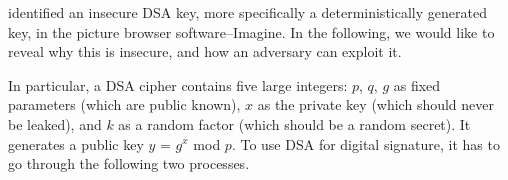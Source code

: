 


\sysname identified an insecure \textsf{\small DSA} key, more specifically a deterministically generated key, in the picture browser software--\textsf{\small Imagine}. In the following, we would like to reveal why this is insecure, and how an adversary can exploit it.

In particular, a \textsf{\small DSA} cipher contains five large integers:  $p$, $q$, $g$ as fixed parameters (which are public known),  $x$ as the private key (which should never be leaked), and $k$ as a random factor (which should be a random secret). It generates a public key $y$ = $g^x$ mod $p$. To use \textsf{\small DSA} for digital signature, it has to go through the following two processes.

